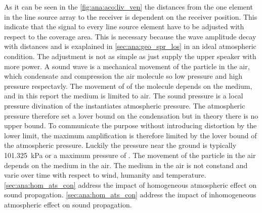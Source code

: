 As it can be seen in the \autoref{fig:ana:aco:liv_ven} the distances from the one element in the line source array to the receiver is dependent on the receiver position. This indicate that the signal to every line source element have to be adjusted with respect to the coverage area. This is necessary because the wave amplitude decay with distances and is exaplained in \autoref{sec:ana:geo_spr_los} in an ideal atmospheric condition. The adjustment is not as simple as just supply the upper speaker with more power. A sound wave is a mechanical movement of the particle in the air, which condensate and compression the air molecule so low pressure and high pressure respectavly. The movement of of the molecule depends on the medium, and in this report the medium is limited to air. The sound pressure is a local pressure divination of the instantiates atmospheric pressure. The atmospheric pressure therefore set a lover bound on the condensation but in theory there is no upper bound. To communicate the purpose without introducing distortion by the lower limit, the maximum amplification is therefore limited by the lover bound of the atmospheric pressure. Luckily the pressure near the ground is typically \SI{101.325}{\kilo\pascal} or a maximum pressure of . The movement of the particle in the air depends on the medium in the air. The medium in the air is not constand and varie over time with respect to wind, humanity and temperature.   \autoref{sec:ana:hom_ats_con} address the impact of homogeneous atmospheric effect on sound propagation. \autoref{sec:ana:hom_ats_con} address the impact of  inhomogeneous atmospheric effect on sound propagation. 